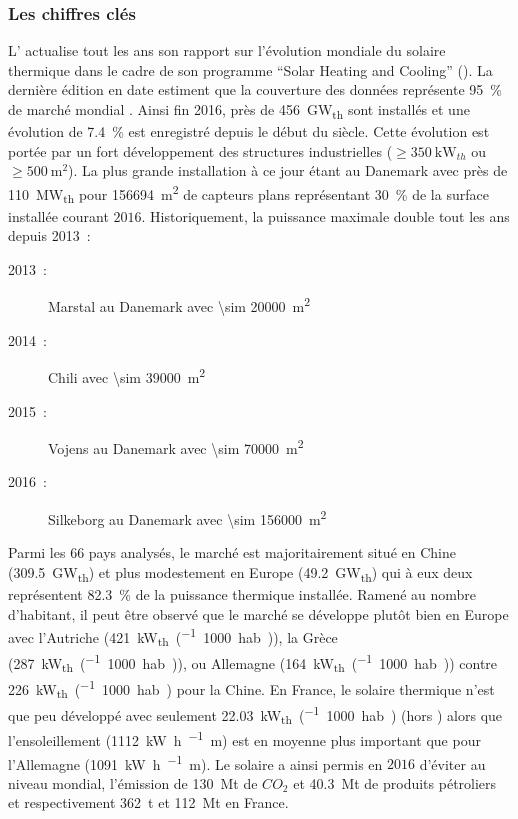 \subsubsection{Les chiffres clés} %
\label{ssub:les_chiffres_cles}
L’ actualise tout les ans son rapport sur l’évolution mondiale du solaire thermique
dans le cadre de son programme \enquote{Solar Heating and Cooling} (). La dernière
édition en date estiment que la couverture des données représente \SI{95}{\percent} de
marché mondial \parencite{Weiss2017}. Ainsi fin 2016, près de \SI{456}{\giga\watt_{th}}
sont installés et une évolution de \SI{7.4}{\percent} est enregistré depuis le début du
siècle. Cette évolution est portée par un fort développement des structures industrielles
($\geq \SI{350}{\kilo\watt_{th}}$ ou $\geq \SI{500}{\metre\squared}$). La plus grande
installation à ce jour étant au Danemark avec près de \SI{110}{\mega\watt_{th}} pour
\SI{156694}{\metre\squared} de capteurs plans représentant \SI{30}{\percent} de la surface
installée courant $2016$. Historiquement, la puissance maximale double tout les ans depuis
2013~:
\begin{description}
    \item[2013~:] Marstal au Danemark avec \SI{\sim 20000}{\metre\squared}
    \item[2014~:] Chili avec \SI{\sim 39000}{\metre\squared}
    \item[2015~:] Vojens au Danemark avec \SI{\sim 70000}{\metre\squared}
    \item[2016~:] Silkeborg  au Danemark avec \SI{\sim 156000}{\metre\squared}
\end{description}
Parmi les $66$ pays analysés, le marché est majoritairement situé en Chine
(\SI{309.5}{\giga\watt_{th}}) et plus modestement en Europe (\SI{49.2}{\giga\watt_{th}})
qui à eux deux représentent \SI{82.3}{\percent} de la puissance thermique installée.
Ramené au nombre d’habitant, il peut être observé que le marché se développe plutôt bien
en Europe avec l’Autriche (\SI{421}{\kilo\watt_{th}\per(1000 hab.)}), la Grèce
(\SI{287}{\kilo\watt_{th}\per(1000 hab.)}), ou Allemagne
(\SI{164}{\kilo\watt_{th}\per(1000 hab.)}) contre \SI{226}{\kilo\watt_{th}\per(1000 hab.)}
pour la Chine. En France, le solaire thermique n’est que peu développé avec seulement
\SI{22.03}{\kilo\watt_{th}\per(1000 hab.)} (hors ) alors que l’ensoleillement
(\SI{1112}{\kilo\watt\hour\per\squared\metre}) est en moyenne plus important que
pour l’Allemagne (\SI{1091}{\kilo\watt\hour\per\squared\metre}).
Le solaire a ainsi permis en $2016$ d’éviter au niveau mondial, l’émission de
\SI{130}{\mega\tonne} de $CO_{2}$ et \SI{40.3}{\mega\tonne} de produits pétroliers et
respectivement \SI{362}{\tonne} et \SI{112}{\mega\tonne} en France.

